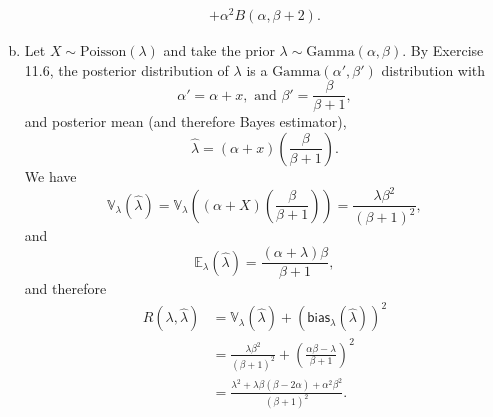 \begin{ex}
\begin{enumerate}[(a)]
\begin{align*}
            +\alpha^2B(\alpha,\beta+2).
          \end{align*}
    \item Let $X\sim\text{Poisson}(\lambda)$ and take the prior
          $\lambda\sim\text{Gamma}(\alpha,\beta)$. By Exercise 11.6, the
          posterior distribution of $\lambda$ is a
          $\text{Gamma}(\alpha',\beta')$ distribution with
          \[
            \alpha'=\alpha+x,\text{ and }
            \beta'=\frac{\beta}{\beta +1},
          \]
          and posterior mean (and therefore Bayes estimator),
          \[
            \widehat{\lambda}=\left(\alpha+x\right)
            \left(\frac{\beta}{\beta +1}\right).
          \]
          We have
          \[
            \mathbb{V}_\lambda\left(
            \widehat{\lambda}
            \right)
            =\mathbb{V}_\lambda\left(
            \left(\alpha+X\right)
            \left(\frac{\beta}{\beta +1}\right)
            \right)
            =\frac{\lambda\beta^2}{(\beta+1)^2},
          \]
          and
          \[
            \mathbb{E}_\lambda\left(
            \widehat{\lambda}
            \right)
            =\frac{(\alpha+\lambda)\beta}{\beta+1},
          \]
          and therefore
          \begin{align*}
            R(\lambda,\widehat{\lambda})
             & =\mathbb{V}_\lambda(\widehat{\lambda})
            +\left(\textsf{bias}_\lambda(\widehat{\lambda})\right)^2                       \\
             & =\frac{\lambda\beta^2}{(\beta+1)^2}
            +\left(\frac{\alpha\beta-\lambda}{\beta+1}\right)^2                            \\
             & =\frac{\lambda^2+\lambda\beta(\beta-2\alpha)+\alpha^2\beta^2}{(\beta+1)^2}.
          \end{align*}


\end{enumerate}
\end{ex}
